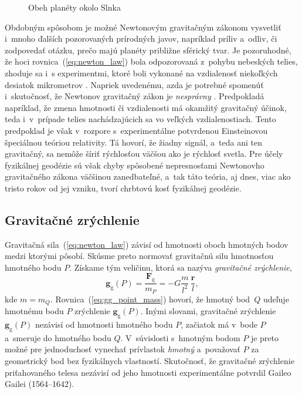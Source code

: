 \documentclass[a4paper, 12pt]{book}
\newcommand{\gidx}{\mathrm g}
\let\vec\mathbf
\begin{document}
\begin{figure}
\centering

\caption{Obeh planéty okolo Slnka}
\label{fig:orbital_motion}
\end{figure}

Obdobným spôsobom je možné Newtonovým gravitačným zákonom vysvetliť i~mnoho 
ďalších pozorovaných prírodných javov, napríklad príliv a~odliv, či zodpovedať 
otázku, prečo majú planéty približne sférický tvar.  Je pozoruhodné, že hoci 
rovnica~(\ref{eq:newton_law}) bola odpozorovaná z~pohybu nebeských telies, 
zhoduje sa i~s experimentmi, ktoré boli vykonané na vzdialenosť niekoľkých 
desiatok mikrometrov \citep{Lee2020}.  Napriek uvedenému, azda je potrebné 
spomenúť i~skutočnosť, že Newtonov gravitačný zákon je \emph{nesprávny} 
\citep{Feynman}.  Predpokladá napríklad, že zmena hmotnosti či vzdialenosti má 
okamžitý gravitačný účinok, teda i~v~prípade telies nachádzajúcich sa vo 
veľkých vzdialenostiach.  Tento predpoklad je však v~rozpore s~experimentálne 
potvrdenou Einsteinovou špeciálnou teóriou relativity.  Tá hovorí, že žiadny 
signál, a~teda ani ten gravitačný, sa nemôže šíriť rýchlosťou väčšou ako je 
rýchlosť svetla.  Pre účely fyzikálnej geodézie sú však chyby spôsobené 
nepresnosťami Newtonovho gravitačného zákona väčšinou zanedbateľné, a~tak táto 
teória, aj dnes, viac ako tristo rokov od jej vzniku, tvorí chrbtovú kosť 
fyzikálnej geodézie.






\subsection{Gravitačné zrýchlenie}
\label{sec:gg}

Gravitačná sila~(\ref{eq:newton_law}) závisí od hmotnosti oboch hmotných 
bodov medzi ktorými pôsobí.  Skúsme preto normovať gravitačnú silu hmotnosťou 
hmotného bodu $P$.  Získame tým veličinu, ktorá sa nazýva \emph{gravitačné 
zrýchlenie},
%
\begin{equation}
\label{eq:gg_point_mass}
\vec g_\gidx(P) = \frac{\vec F_\gidx}{m_P} = -G \frac{m}{l^2} \, \frac{\vec 
r}{l}{,}
\end{equation}
%
kde $m = m_Q$.  Rovnica~(\ref{eq:gg_point_mass}) hovorí, že hmotný 
bod~$Q$ udeľuje hmotnému bodu $P$ zrýchlenie $\vec g_\gidx(P)$.   Inými 
slovami, gravitačné zrýchlenie $\vec g_\gidx(P)$ nezávisí od hmotnosti hmotného 
bodu $P$, začiatok má v~bode $P$ a~smeruje do hmotného bodu $Q$.  V~súvislosti 
s~hmotným bodom $P$ je preto možné pre jednoduchosť vynechať prívlastok 
\emph{hmotný} a~považovať $P$ za geometrický bod bez fyzikálnych vlastností.  
Skutočnosť, že gravitačné zrýchlenie priťahovaného telesa nezávisí od jeho 
hmotnosti experimentálne potvrdil Gaileo Gailei (1564--1642).
\end{document}
